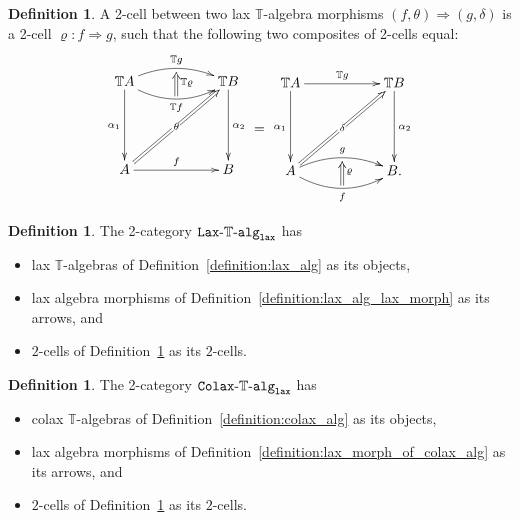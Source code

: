 \documentclass[12pt,leqno]{amsart}
\theoremstyle{definition}
\newtheorem{definition}[theorem]{Definition}
\def\T{\mathbb{T}}
\newcommand{\4}{\texttt{4}}
\renewcommand{\rho}{\varrho}
\begin{document}
\begin{definition}\label{definition:2-cell}
A 2-cell between two lax $\T$-algebra morphisms $(f,\theta)\Rightarrow
(g,\delta)$ is a 2-cell $\rho \colon f\Rightarrow g$, such that the
following two composites of 2-cells equal:
\begin{equation}
    \label{equation:2-cell}
\xymatrix@R=.2em{
&&
\\
\T A  \ar[ddddddd]_{\alpha_1} 
\ar@/^1em/[rr]^{\T g}  \ar@/_1.2em/[rr]_{\T f} && 
\T B  \ar[ddddddd]^{\alpha_2} 
\\
& \ar@{=>}[uu]_{\T\rho}
\\
\\
\\
\\
\\
\\
A \ar[rr]^f \ar@{=>}[rruuuuuuu]|\hole|\theta  && B
}
\raisebox{-4.5em}{\ $=$}
\raisebox{-1em}{
\xymatrix@R=.2em{
\T A  \ar[ddddddd]_{\alpha_1}  
\ar[rr]^{\T g}  &&  
\T B  \ar[ddddddd]^{\alpha_2} 
\\
\\
\\
\\
\\
\\ &&
\\
A  \ar@{=>}[rruuuuuuu]|\hole|\delta
\ar@/^1em/[rr]^{g}  \ar@/_1.2em/[rr]_{f} && 
B  .
\\
& \ar@{=>}[uu]_{\rho}
}
}
\end{equation}
\end{definition}

\begin{definition}\label{definition:Lax-T-alg_lax}
    The 2-category $\tt{Lax}\hbox{-}\T\tt{\hbox{-}alg}_{\tt{lax}}$ 
has
\begin{itemize}[topsep=0pt, partopsep=0pt, itemsep=0pt, itemindent=-2em]
        \item lax $\T$-algebras of Definition~\ref{definition:lax_alg}
          as its objects,
        \item lax algebra morphisms of
          Definition~\ref{definition:lax_alg_lax_morph} as its arrows, and
        \item 
    $2$-cells of Definition~\ref{definition:2-cell} as its $2$-cells. 
    \end{itemize}
\end{definition}

\begin{definition}
    The 2-category $\tt{Colax}\hbox{-}\T\tt{\hbox{-}alg}_{\tt{lax}}$ 
has
    \begin{itemize}[topsep=0pt, partopsep=0pt, itemsep=0pt, itemindent=-2em]
        \item colax $\T$-algebras of Definition~\ref{definition:colax_alg}
          as its objects,
        \item lax algebra morphisms of
          Definition~\ref{definition:lax_morph_of_colax_alg} as its arrows, and
        \item 
    $2$-cells of Definition~\ref{definition:2-cell} as its $2$-cells. 
    \end{itemize}
\end{definition}
\end{document}
